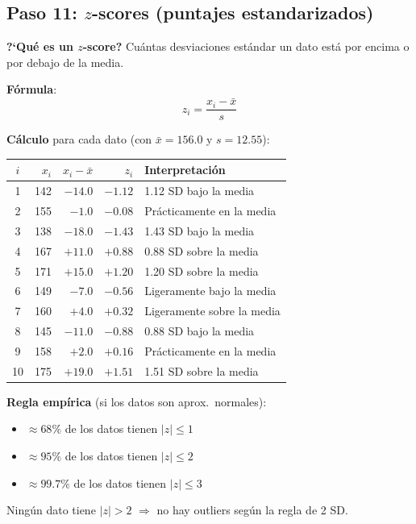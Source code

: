 \documentclass[11pt, a4paper]{article}
\begin{document}
\subsection{Paso 11: $z$-scores (puntajes estandarizados)}

\textbf{?`Qu\'e es un $z$-score?} Cu\'antas desviaciones est\'andar un dato est\'a por encima
o por debajo de la media.

\textbf{F\'ormula}:
\[
z_i = \frac{x_i - \bar{x}}{s}
\]

\textbf{C\'alculo} para cada dato (con $\bar{x} = 156.0$ y $s = 12.55$):

\begin{center}
\small
\begin{tabular}{crrrl}
\toprule
$i$ & $x_i$ & $x_i - \bar{x}$ & $z_i$ & Interpretaci\'on \\
\midrule
1 & 142 & $-14.0$ & $-1.12$ & 1.12 SD bajo la media \\
2 & 155 & $-1.0$  & $-0.08$ & Pr\'acticamente en la media \\
3 & 138 & $-18.0$ & $-1.43$ & 1.43 SD bajo la media \\
4 & 167 & $+11.0$ & $+0.88$ & 0.88 SD sobre la media \\
5 & 171 & $+15.0$ & $+1.20$ & 1.20 SD sobre la media \\
6 & 149 & $-7.0$  & $-0.56$ & Ligeramente bajo la media \\
7 & 160 & $+4.0$  & $+0.32$ & Ligeramente sobre la media \\
8 & 145 & $-11.0$ & $-0.88$ & 0.88 SD bajo la media \\
9 & 158 & $+2.0$  & $+0.16$ & Pr\'acticamente en la media \\
10 & 175 & $+19.0$ & $+1.51$ & 1.51 SD sobre la media \\
\bottomrule
\end{tabular}
\end{center}

\textbf{Regla emp\'irica} (si los datos son aprox.\ normales):
\begin{itemize}
  \item $\approx 68\%$ de los datos tienen $|z| \leq 1$
  \item $\approx 95\%$ de los datos tienen $|z| \leq 2$
  \item $\approx 99.7\%$ de los datos tienen $|z| \leq 3$
\end{itemize}

Ning\'un dato tiene $|z| > 2$ $\Rightarrow$ no hay outliers seg\'un la regla de 2 SD.
\end{document}
